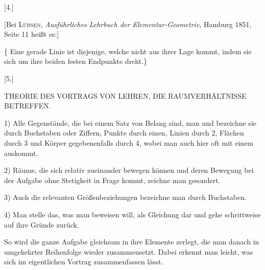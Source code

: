 \begin{center}
[4.]
\end{center}

[Bei \textsc{Lübsen}, \emph{Ausf\"uhrliches Lehrbuch der Elementar-Geometrie}, Hamburg 1851, Seite 11 heißt es:]

\{ Eine gerade Linie ist diejenige, welche nicht aus ihrer Lage kommt, indem sie sich um ihre beiden festen Endpunkte dreht.\}



\begin{center}
[5.]

\textnormal{THEORIE DES VORTRAGS VON LEHREN, DIE RAUMVERHÄLTNISSE BETREFFEN.}
\end{center}

1) Alle Gegenstände, die bei einem Satz von Belang sind,  man und bezeichne sie durch Buchstaben oder Ziffern, Punkte durch einen, Linien durch 2, Flächen durch 3 und Körper gegebenenfalls durch 4, wobei man auch hier oft mit einem auskommt.

2) Räume, die sich relativ zueinander bewegen können und deren Bewegung bei der Aufgabe ohne Stetigkeit in Frage kommt, zeichne man gesondert.

3) Auch die relevanten Größenbeziehungen bezeichne man durch Buchstaben.

4) Man stelle das, was man beweisen will, als Gleichung dar und gehe schrittweise auf ihre Gründe zurück.

So wird die ganze Aufgabe gleichsam in ihre Elemente zerlegt, die man danach in umgekehrter Reihenfolge wieder zusammensetzt. Dabei erkennt man leicht, was sich im eigentlichen Vortrag zusammenfassen lässt.


